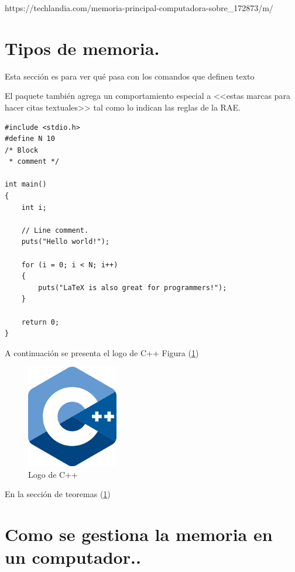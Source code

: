 \documentclass[12pt]{article}
\begin{document}
https://techlandia.com/memoria-principal-computadora-sobre_172873/m/
\section{Tipos de memoria.} \label{contenido}

Esta sección es para ver qué pasa con los comandos 
que definen texto

El paquete también agrega un comportamiento especial 
a <<estas marcas para hacer citas textuales>> tal como 
lo indican las reglas de la RAE. \cite{dirac}

\begin{lstlisting}
#include <stdio.h>
#define N 10
/* Block
 * comment */

int main()
{
    int i;

    // Line comment.
    puts("Hello world!");
    
    for (i = 0; i < N; i++)
    {
        puts("LaTeX is also great for programmers!");
    }

    return 0;
}
\end{lstlisting}

A continuación se presenta el logo de C++ Figura (\ref{fig:cpplogo})

\begin{figure}[h]
\includegraphics[width=4cm]{cpplogo.png}
\centering
\caption{Logo de C++}
\label{fig:cpplogo}
\end{figure}

En la sección de teoremas (\ref{contenido})

\section{Como se gestiona la memoria en un computador..} \label{conclulsion}



\end{document}
